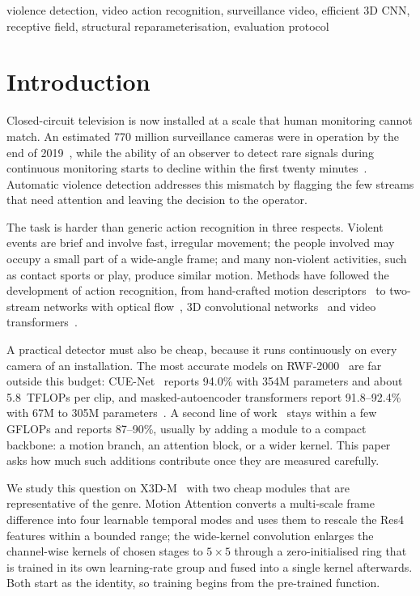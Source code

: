 \documentclass[conference]{IEEEtran}
\begin{document}
\begin{IEEEkeywords}
violence detection, video action recognition, surveillance video,
efficient 3D CNN, receptive field, structural reparameterisation,
evaluation protocol
\end{IEEEkeywords}

\section{Introduction}
\label{sec:intro}

Closed-circuit television is now installed at a scale that human
monitoring cannot match. An estimated 770 million surveillance cameras
were in operation by the end of 2019~\cite{cnbc2019}, while the ability of
an observer to detect rare signals during continuous monitoring starts to
decline within the first twenty minutes~\cite{mackworth1948}. Automatic
violence detection addresses this mismatch by flagging the few streams
that need attention and leaving the decision to the operator.

The task is harder than generic action recognition in three respects.
Violent events are brief and involve fast, irregular movement; the people
involved may occupy a small part of a wide-angle frame; and many
non-violent activities, such as contact sports or play, produce similar
motion. Methods have followed the development of action recognition, from
hand-crafted motion descriptors~\cite{idt,vif,hockey} to two-stream
networks with optical flow~\cite{twostream}, 3D convolutional
networks~\cite{c3d,i3d,slowfast,x3d} and video
transformers~\cite{timesformer,videoswin}.

A practical detector must also be cheap, because it runs continuously on
every camera of an installation. The most accurate models on
RWF-2000~\cite{rwf2000} are far outside this budget: CUE-Net~\cite{cuenet}
reports 94.0\% with 354M parameters and about 5.8~TFLOPs per clip, and
masked-autoencoder transformers report 91.8--92.4\% with 67M to 305M
parameters~\cite{videomae,mixvit}. A second line of
work~\cite{rwf2000,sepconvlstm,mdcn,biltma} stays within a few GFLOPs and
reports 87--90\%, usually by adding a module to a compact backbone: a
motion branch, an attention block, or a wider kernel. This paper asks how
much such additions contribute once they are measured carefully.

We study this question on X3D-M~\cite{x3d} with two cheap modules that are
representative of the genre. Motion Attention converts a multi-scale frame
difference into four learnable temporal modes and uses them to rescale the
Res4 features within a bounded range; the wide-kernel convolution enlarges
the channel-wise kernels of chosen stages to $5\times5$ through a
zero-initialised ring that is trained in its own learning-rate group and
fused into a single kernel afterwards. Both start as the identity, so
training begins from the pre-trained function.
\end{document}

